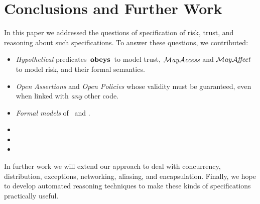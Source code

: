 \section{Conclusions and Further Work}
\label{section:conclusion}

In this paper we addressed the questions of specification of risk, trust, and reasoning about such specifications. To answer these questions, we contributed:
\begin{itemize}
\item {\em Hypothetical} predicates $\,\textbf{\textrm{obeys}}\,$ to model trust,
  $\mathcal{M}\textrm{\textit{ay}}{\mathcal{A}}\textrm{\textit{ccess}}$ and $\mathcal{M}\textrm{\textit{ay}}{\mathcal{A}}\textrm{\textit{ffect}}$ to model risk, and their formal semantics.
\item {\em Open Assertions} and {\em Open Policies} whose validity
  must be guaranteed, even when linked with  {\em any} other code.
\item {\em Formal models} of \LangOO\, and \Chainmail.
\item {}  
\item {}
\item {}
\end{itemize}




%
%
\noindent In further work we will extend our approach 
to deal with
concurrency, distribution, exceptions, networking, aliasing, and
encapsulation.
Finally, we hope to develop automated reasoning
techniques to make these kinds of specifications practically useful.


